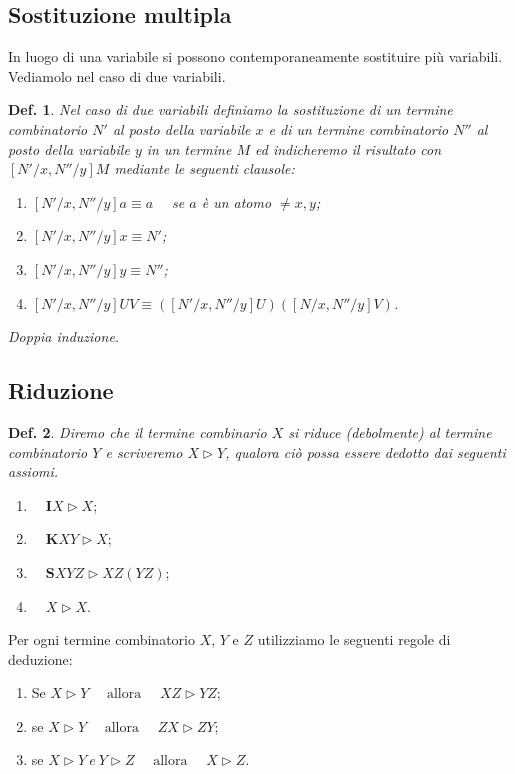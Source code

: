 \documentclass{book}
\newtheorem{definizione}{Def.}[chapter]
\newcommand*{\ii}{\mathbf{I}}    %
\newcommand*{\kk}{\mathbf{K}}    %
\newcommand*{\sss}{\mathbf{S}}   %
\begin{document}
\subsection{Sostituzione multipla}
In luogo di una variabile si possono contemporaneamente sostituire pi\`u
variabili. Vediamolo nel caso di due variabili.
\begin{definizione}Nel caso di due variabili definiamo la sostituzione di un
termine combinatorio $N'$ al posto della variabile $x$ e di un termine
combinatorio $N''$ al posto della variabile $y$ in un termine $M$ ed
indicheremo il risultato con $[N'/x, N''/y]M$ mediante le seguenti clausole:
\begin{enumerate}
\item[-]$[N'/x, N''/y]a  \equiv  a \quad$ se $a$ \`e un atomo $\neq x, y$;
\item[-]$[N'/x, N''/y]x  \equiv  N'$;
\item[-]$[N'/x, N''/y]y  \equiv N''$;
\item[-]$[N'/x, N''/y]UV  \equiv ([N'/x, N''/y]U)([N/x,  N''/y]V)$.
\end{enumerate}
Doppia induzione.
\end{definizione}

\subsection{Riduzione}
\begin{definizione}
Diremo che il termine combinario $X$ si \emph{riduce (debolmente)} al termine
combinatorio $Y$ e scriveremo $X \vartriangleright Y$, qualora ci\`o possa
essere dedotto dai seguenti assiomi.
\end{definizione}
\begin{enumerate}
\item[(I)]$\quad \ii X  \vartriangleright X$;
\item[(K)]$\quad \kk XY  \vartriangleright X$;
\item[(S)]$\quad \sss XYZ  \vartriangleright XZ(YZ)$;
\item[($\rho$)]$\quad X \vartriangleright X$.
\end{enumerate}
Per ogni termine combinatorio $X$, $Y$ e $Z$ utilizziamo le seguenti regole di 
deduzione:
\begin{enumerate}
\item[-]Se $X  \vartriangleright Y \quad \text{ allora } \quad XZ
\vartriangleright YZ$;
\item[-]se $X  \vartriangleright Y \quad \text{ allora } \quad ZX
\vartriangleright ZY$;
\item[-]se $X  \vartriangleright Y \ e \ Y  \vartriangleright Z
\quad \text{ allora } \quad X  \vartriangleright Z$.
\end{enumerate}
\end{document}
